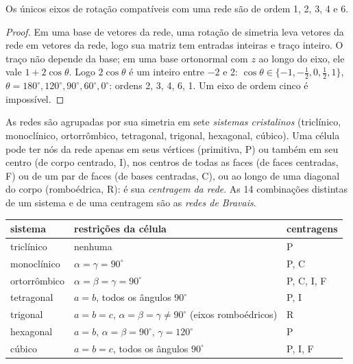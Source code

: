 \begin{theorem}\label{thm:b3:x-ray-diffraction:restriction}
Os únicos eixos de rotação compatíveis com uma rede são de ordem 1, 2, 3, 4 e 6.
\end{theorem}

\begin{proof}
Em uma base de vetores da rede, uma rotação de simetria leva vetores da rede em
vetores da rede, logo sua matriz tem entradas inteiras e traço inteiro. O
traço não depende da base; em uma base ortonormal com $z$ ao longo do eixo,
ele vale $1 + 2\cos\theta$. Logo $2\cos\theta$ é um inteiro entre $-2$ e 2:
$\cos\theta \in \{-1, -\frac12, 0, \frac12, 1\}$, $\theta = 180^\circ, 120^\circ, 90^\circ,
60^\circ, 0^\circ$: ordens 2, 3, 4, 6, 1. Um eixo de ordem cinco é impossível.
\end{proof}

\begin{definition}\label{def:b3:x-ray-diffraction:crystal-system}
As redes são agrupadas por sua simetria em sete \emph{sistemas
cristalinos} (triclínico, monoclínico, ortorrômbico, tetragonal,
trigonal, hexagonal, cúbico). Uma célula pode ter nós da rede apenas em seus
vértices (primitiva, P) ou também em seu centro (de corpo centrado, I), nos
centros de todas as faces (de faces centradas, F) ou de um par de faces (de
bases centradas, C), ou ao longo de uma diagonal do corpo (romboédrica, R): é sua
\emph{centragem da rede}. As 14 combinações distintas de um
sistema e de uma centragem são as \emph{redes de Bravais}.
\end{definition}

\begin{center}\small
\begin{tabular}{lll}
\hline
sistema & restrições da célula & centragens \\ \hline
triclínico & nenhuma & P \\
monoclínico & $\alpha = \gamma = 90^\circ$ & P, C \\
ortorrômbico & $\alpha = \beta = \gamma = 90^\circ$ & P, C, I, F \\
tetragonal & $a = b$, todos os ângulos $90^\circ$ & P, I \\
trigonal & $a = b = c$, $\alpha = \beta = \gamma \ne 90^\circ$ (eixos romboédricos) & R \\
hexagonal & $a = b$, $\alpha = \beta = 90^\circ$, $\gamma = 120^\circ$ & P \\
cúbico & $a = b = c$, todos os ângulos $90^\circ$ & P, I, F \\ \hline
\end{tabular}
\end{center}

